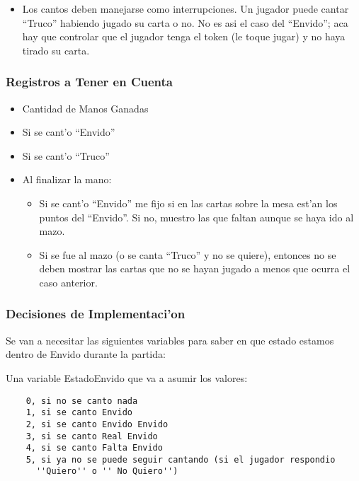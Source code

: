 
\begin{itemize}
\item Los cantos deben manejarse como interrupciones. Un jugador puede cantar ``Truco'' habiendo jugado su carta o no. No es asi el caso del ``Envido''; aca hay que controlar que el jugador tenga el token (le toque jugar) y no haya tirado su carta.
\end{itemize}

\subsubsection{Registros a Tener en Cuenta}
\begin{itemize}
\item Cantidad de Manos Ganadas
\item Si se cant'o ``Envido''
\item Si se cant'o ``Truco''
\item Al finalizar la mano:
	\begin{itemize}
    \item Si se cant'o ``Envido'' me fijo si en las cartas sobre la mesa est'an los puntos del ``Envido''. Si no, muestro las que faltan aunque se haya ido al mazo.
    \item Si se fue al mazo (o se canta ``Truco'' y no se quiere), entonces no se deben mostrar las cartas que no se hayan jugado a menos que ocurra el caso anterior.
	\end{itemize}
\end{itemize}

\subsubsection{Decisiones de Implementaci'on}
Se van a necesitar las siguientes variables para saber en que estado estamos dentro de Envido durante la
partida:


Una variable EstadoEnvido que va a asumir los valores:

\begin{verbatim}
    0, si no se canto nada
    1, si se canto Envido
    2, si se canto Envido Envido
    3, si se canto Real Envido
    4, si se canto Falta Envido
    5, si ya no se puede seguir cantando (si el jugador respondio
      ''Quiero'' o '' No Quiero'')
\end{verbatim}

